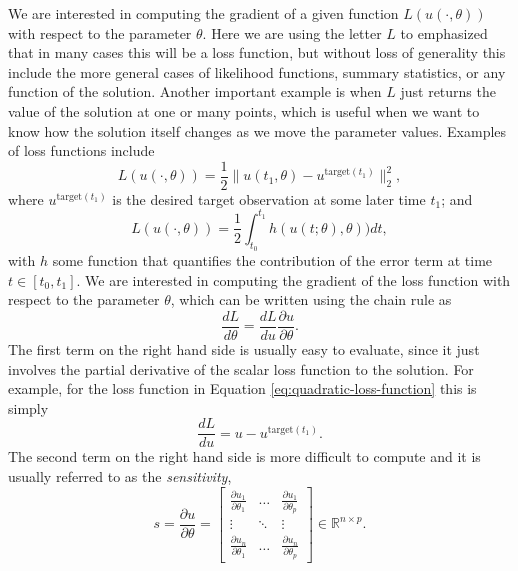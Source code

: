We are interested in computing the gradient of a given function $L(u(\cdot, \theta))$ with respect to the parameter $\theta$.
Here we are using the letter $L$ to emphasized that in many cases this will be a loss function, but without loss of generality this include the more general cases of likelihood functions, summary statistics, or any function of the solution. 
Another important example is when $L$ just returns the value of the solution at one or many points, which is useful when we want to know how the solution itself changes as we move the parameter values. 
Examples of loss functions include
\begin{equation}
 L(u(\cdot, \theta)) = \frac{1}{2} \| u(t_1, \theta) - u^{\text{target}(t_1)} \|_2^2,
 \label{eq:quadratic-loss-function}
\end{equation}
where $u^{\text{target}(t_1)}$ is the desired target observation at some later time $t_1$; and
\begin{equation}
 L(u(\cdot, \theta)) = \frac{1}{2} \int_{t_0}^{t_1} h( u(t;\theta), \theta) ) dt, 
\end{equation}
with $h$ some function that quantifies the contribution of the error term at time $t \in [t_0, t_1]$.
We are interested in computing the gradient of the loss function with respect to the parameter $\theta$, which can be written using the chain rule as
\begin{equation}
 \frac{dL}{d\theta} = \frac{dL}{du} \frac{\partial u}{\partial \theta}.
 \label{eq:dLdtheta_VJP}
\end{equation} 
The first term on the right hand side is usually easy to evaluate, since it just involves the partial derivative of the scalar loss function to the solution.
For example, for the loss function in Equation \eqref{eq:quadratic-loss-function} this is simply
\begin{equation}
    \frac{dL}{du} = u - u^{\text{target}(t_1)}.
    \label{eq:dLdu}
\end{equation}
The second term on the right hand side is more difficult to compute and it is usually referred to as the \textit{sensitivity},
\begin{equation}
 s 
 = 
 \frac{\partial u}{\partial \theta} 
 =
 \begin{bmatrix}
   \frac{\partial u_1}{\partial \theta_1} & \dots & \frac{\partial u_1}{\partial \theta_p} \\
   \vdots & \ddots & \vdots \\
   \frac{\partial u_n}{\partial \theta_1} & \dots & \frac{\partial u_n}{\partial \theta_p}
 \end{bmatrix}
 \in \mathbb R^{n \times p}.
 \label{eq:sensitivity-definition}
\end{equation}

